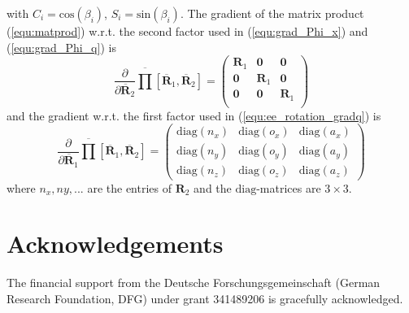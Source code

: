 \documentclass[twocolumn,10pt]{IFTOMM}
\newcommand{\bm}[1]{\boldsymbol{#1}}
\begin{document}
%
with $C_i=\mathrm{cos}(\beta_i)$, $S_i=\mathrm{sin}(\beta_i)$.
The gradient of the matrix product (\ref{equ:matprod}) w.r.t. the second factor used in (\ref{equ:grad_Phi_x}) and (\ref{equ:grad_Phi_q}) is
%
\begin{equation}
\frac{\partial }{\partial \overline{\bm{R}}_2}
\overline{\prod}\left[ \overline{\bm{R}}_1, \overline{\bm{R}}_2\right]
=
\begin{pmatrix}
\bm{R}_1 & \bm{0} & \bm{0} \\
\bm{0} & \bm{R}_1 & \bm{0} \\
\bm{0} & \bm{0} & \bm{R}_1  \\
\end{pmatrix}
\end{equation}
%
and the gradient w.r.t. the first factor used in (\ref{equ:ee_rotation_gradq}) is
%
\begin{equation}
\frac{\partial }{\partial \overline{\bm{R}}_1}
\overline{\prod}\left[ \overline{\bm{R}}_1, \overline{\bm{R}}_2\right]
=
\begin{pmatrix}
{\mathrm{diag}}(n_x)&{\mathrm{diag}}(o_x)&{\mathrm{diag}}(a_x) \\ {\mathrm{diag}}(n_y)&{\mathrm{diag}}(o_y)&{\mathrm{diag}}(a_y)\\ {\mathrm{diag}}(n_z)&{\mathrm{diag}}(o_z)&{\mathrm{diag}}(a_z)
\end{pmatrix}
\end{equation}
%
where $n_x,ny,...$ are the entries of $\bm{R}_2$ and the $\mathrm{diag}$-matrices are $3 \times 3$.
\section{Acknowledgements}

The financial support from the Deutsche Forschungsgemeinschaft (German Research Foundation, DFG) under grant 341489206 is gracefully acknowledged.



\end{document}
